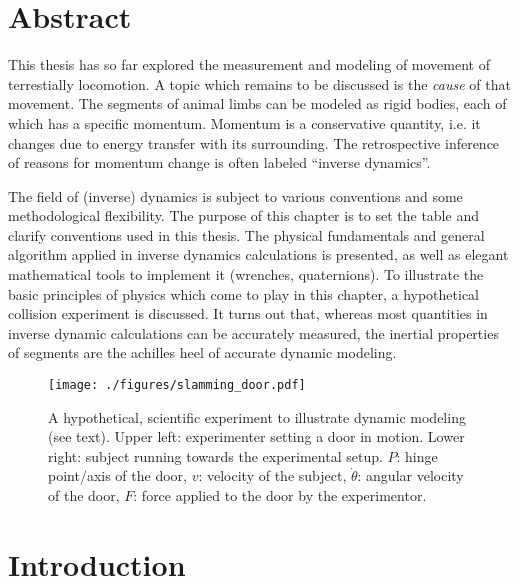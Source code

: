 \clearpage


\section{Abstract}
\label{sec:org8cd7e65}
This thesis has so far explored the measurement and modeling of movement of terrestially locomotion.
A topic which remains to be discussed is the \emph{cause} of that movement.
The segments of animal limbs can be modeled as rigid bodies, each of which has a specific momentum.
Momentum is a conservative quantity, i.e. it changes due to energy transfer with its surrounding.
The retrospective inference of reasons for momentum change is often labeled ``inverse dynamics''.

The field of (inverse) dynamics is subject to various conventions and some methodological flexibility.
The purpose of this chapter is to set the table and clarify conventions used in this thesis.
The physical fundamentals and general algorithm applied in inverse dynamics calculations is presented, as well as elegant mathematical tools to implement it (wrenches, quaternions).
To illustrate the basic principles of physics which come to play in this chapter, a hypothetical collision experiment is discussed.
It turns out that, whereas most quantities in inverse dynamic calculations can be accurately measured, the inertial properties of segments are the achilles heel of accurate dynamic modeling.



\begin{figure}[p]
\centering
\texttt{[image: ./figures/slamming\_door.pdf]}
\caption{\label{fig:slamming}A hypothetical, scientific experiment to illustrate dynamic modeling (see text). Upper left: experimenter setting a door in motion. Lower right: subject running towards the experimental setup. \(P\): hinge point/axis of the door, \(v\): velocity of the subject, \(\dot\theta\): angular velocity of the door, \(F\): force applied to the door by the experimentor.}
\end{figure}


\FloatBarrier\clearpage
\section{Introduction}
\label{sec:org4e226b8}
